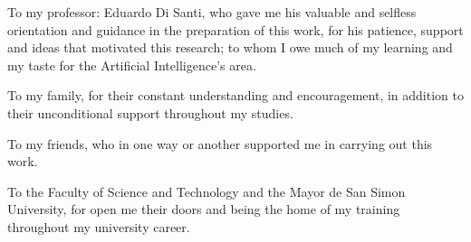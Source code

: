 \documentclass[11pt,spanish,singlespacing,headsepline]{MastersDoctoralThesis}
\begin{document}
\begin{acknowledgements}
\addchaptertocentry{\acknowledgementname} 
\bigskip

To my professor: Eduardo Di Santi, who gave me his valuable and selfless orientation and guidance in the preparation of this work, for his patience, support and ideas that motivated this research; to whom I owe much of my learning and my taste for the Artificial Intelligence's area.

\vspace{5mm} %

To my family, for their constant understanding and encouragement, in addition to their unconditional support throughout my studies.

\vspace{5mm} %

To my friends, who in one way or another supported me in carrying out this work.

\vspace{5mm} %

To the Faculty of Science and Technology and the Mayor de San Simon University, for open me their doors and being the home of my training throughout my university career.

\end{acknowledgements}
 


\end{document}
